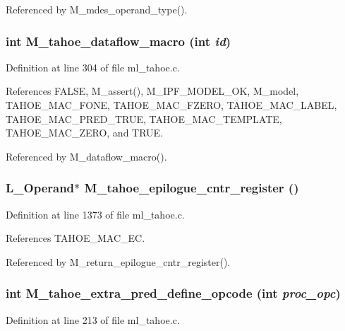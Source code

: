 Referenced by M\_\-mdes\_\-operand\_\-type().
\subsubsection{\setlength{\rightskip}{0pt plus 5cm}int M\_\-tahoe\_\-dataflow\_\-macro (int {\em id})}\label{ml__tahoe_8c_065f72221d34587845c36c927f067b84}




Definition at line 304 of file ml\_\-tahoe.c.

References FALSE, M\_\-assert(), M\_\-IPF\_\-MODEL\_\-OK, M\_\-model, TAHOE\_\-MAC\_\-FONE, TAHOE\_\-MAC\_\-FZERO, TAHOE\_\-MAC\_\-LABEL, TAHOE\_\-MAC\_\-PRED\_\-TRUE, TAHOE\_\-MAC\_\-TEMPLATE, TAHOE\_\-MAC\_\-ZERO, and TRUE.

Referenced by M\_\-dataflow\_\-macro().
\subsubsection{\setlength{\rightskip}{0pt plus 5cm}L\_\-Operand$\ast$ M\_\-tahoe\_\-epilogue\_\-cntr\_\-register ()}\label{ml__tahoe_8c_47dd2f6b01fb0ccce422726ed0408e4b}




Definition at line 1373 of file ml\_\-tahoe.c.

References TAHOE\_\-MAC\_\-EC.

Referenced by M\_\-return\_\-epilogue\_\-cntr\_\-register().
\subsubsection{\setlength{\rightskip}{0pt plus 5cm}int M\_\-tahoe\_\-extra\_\-pred\_\-define\_\-opcode (int {\em proc\_\-opc})}\label{ml__tahoe_8c_dcd24d2a3a178991a035525ed9156b70}




Definition at line 213 of file ml\_\-tahoe.c.

